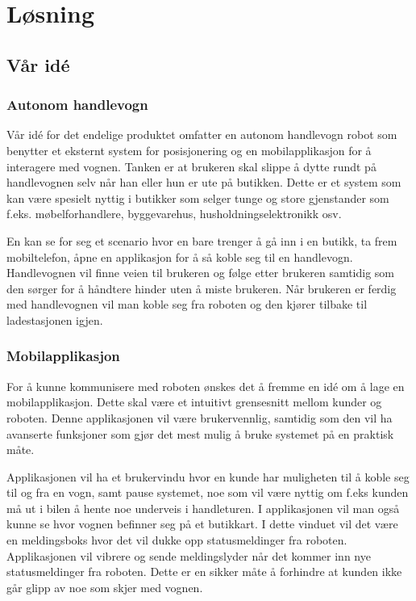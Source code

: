 
\chapter{Løsning} %

\label{ch:losning} %


\section{Vår idé}
\subsection{Autonom handlevogn}
Vår idé for det endelige produktet omfatter en autonom handlevogn robot som benytter et eksternt system for posisjonering og en mobilapplikasjon for å interagere med vognen. Tanken er at brukeren skal slippe å dytte rundt på handlevognen selv når han eller hun er ute på butikken. Dette er et system som kan være spesielt nyttig i butikker som selger tunge og store gjenstander som f.eks. møbelforhandlere, byggevarehus, husholdningselektronikk osv. 

En kan se for seg et scenario hvor en bare trenger å gå inn i en butikk, ta frem mobiltelefon, åpne en applikasjon for å så koble seg til en handlevogn. Handlevognen vil finne veien til brukeren og følge etter brukeren samtidig som den sørger for å håndtere hinder uten å miste brukeren. Når brukeren er ferdig med handlevognen vil man koble seg fra roboten og den kjører tilbake til ladestasjonen igjen.

\subsection{Mobilapplikasjon}
For å kunne kommunisere med roboten ønskes det å fremme en idé om å lage en mobilapplikasjon. Dette skal være et intuitivt grensesnitt mellom kunder og roboten. Denne applikasjonen vil være brukervennlig, samtidig som den vil ha avanserte funksjoner som gjør det mest mulig å bruke systemet på en praktisk måte.

Applikasjonen vil ha et brukervindu hvor en kunde har muligheten til å koble seg til og fra en vogn, samt pause systemet, noe som vil være nyttig om f.eks kunden må ut i bilen å hente noe underveis i handleturen. I applikasjonen vil man også kunne se hvor vognen befinner seg på et butikkart. I dette vinduet vil det være en meldingsboks hvor det vil dukke opp statusmeldinger fra roboten. Applikasjonen vil vibrere og sende meldingslyder når det kommer inn nye statusmeldinger fra roboten. Dette er en sikker måte å forhindre at kunden ikke går glipp av noe som skjer med vognen. 

